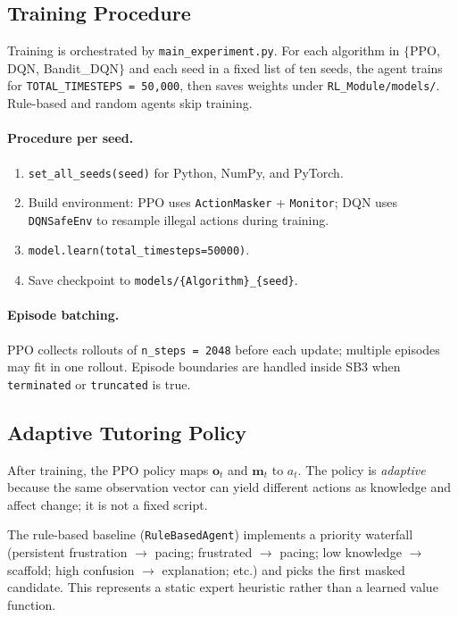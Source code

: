 \subsection{Training Procedure}\label{sec:method_rl_training}

Training is orchestrated by \texttt{main\_experiment.py}. For each algorithm in $\{$PPO, DQN, Bandit\_DQN$\}$ and each seed in a fixed list of ten seeds, the agent trains for \texttt{TOTAL\_TIMESTEPS = 50{,}000}, then saves weights under \texttt{RL\_Module/models/}. Rule-based and random agents skip training.

\paragraph{Procedure per seed.}
\begin{enumerate}
    \item \texttt{set\_all\_seeds(seed)} for Python, NumPy, and PyTorch.
    \item Build environment: PPO uses \texttt{ActionMasker} + \texttt{Monitor}; DQN uses \texttt{DQNSafeEnv} to resample illegal actions during training.
    \item \texttt{model.learn(total\_timesteps=50000)}.
    \item Save checkpoint to \texttt{models/\{Algorithm\}\_\{seed\}}.
\end{enumerate}

\paragraph{Episode batching.}
PPO collects rollouts of \texttt{n\_steps = 2048} before each update; multiple episodes may fit in one rollout. Episode boundaries are handled inside SB3 when \texttt{terminated} or \texttt{truncated} is true.

\subsection{Adaptive Tutoring Policy}\label{sec:method_policy}

After training, the PPO policy maps $\mathbf{o}_t$ and $\mathbf{m}_t$ to $a_t$. The policy is \emph{adaptive} because the same observation vector can yield different actions as knowledge and affect change; it is not a fixed script.

The rule-based baseline (\texttt{RuleBasedAgent}) implements a priority waterfall (persistent frustration $\rightarrow$ pacing; frustrated $\rightarrow$ pacing; low knowledge $\rightarrow$ scaffold; high confusion $\rightarrow$ explanation; etc.) and picks the first masked candidate. This represents a static expert heuristic rather than a learned value function.

